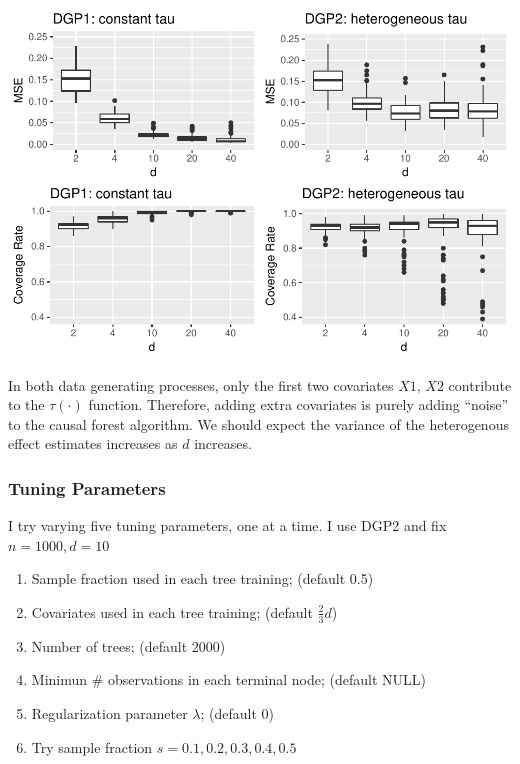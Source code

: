\documentclass[]{article}
\begin{document}
\includegraphics{report_files/figure-latex/unnamed-chunk-3-1.pdf}

In both data generating processes, only the first two covariates \(X1\),
\(X2\) contribute to the \(\tau(\cdot)\) function. Therefore, adding
extra covariates is purely adding ``noise'' to the causal forest
algorithm. We should expect the variance of the heterogenous effect
estimates increases as \(d\) increases.

\subsubsection{Tuning Parameters}\label{tuning-parameters}

I try varying five tuning parameters, one at a time. I use DGP2 and fix
\(n=1000, d=10\)

\begin{enumerate}
\def\labelenumi{\arabic{enumi}.}
\item
  Sample fraction used in each tree training; (default 0.5)
\item
  Covariates used in each tree training; (default \(\frac{2}{3}d\))
\item
  Number of trees; (default 2000)
\item
  Minimun \# observations in each terminal node; (default NULL)
\item
  Regularization parameter \(\lambda\); (default 0)
\item
  Try sample fraction \(s = 0.1, 0.2, 0.3, 0.4, 0.5\)
\end{enumerate}
\end{document}
